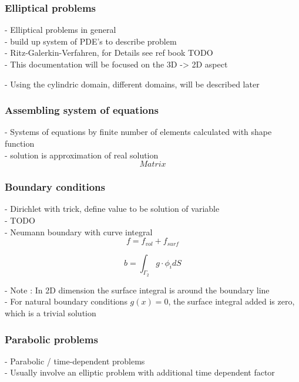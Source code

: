 \documentclass[parskip=half, titlepage=yes, 12pt, BCOR=12mm, DIV=calc]{scrartcl}
\begin{document}
\subsubsection{Elliptical problems}
- Elliptical problems in general \\
- build up system of PDE's to describe problem \\

- Ritz-Galerkin-Verfahren, for Details see ref book TODO \\
- This documentation will be focused on the 3D -> 2D aspect


- Using the cylindric domain, different domains, will be described later \\


\subsubsection{Assembling system of equations}
- Systems of equations by finite number of elements calculated with shape function \\
- solution is approximation of real solution \\

\begin{equation}
    Matrix
\end{equation}

\subsubsection{Boundary conditions}
- Dirichlet with trick, define value to be solution of variable \\
- TODO \\


- Neumann boundary with curve integral \\

\begin{equation}
    f = f_{vol} + f_{surf}
\end{equation}

\begin{equation}
    b = \int_{\Gamma_2} g \cdot \phi_{i} d S 
\end{equation}

- Note : In 2D dimension the surface integral is around the boundary line \\
- For natural boundary conditions $g(x) = 0$, the surface integral added is zero, which is a trivial solution \\

\subsubsection{Parabolic problems}
- Parabolic / time-dependent problems \\
- Usually involve an elliptic problem with additional time dependent factor \\
\end{document}
